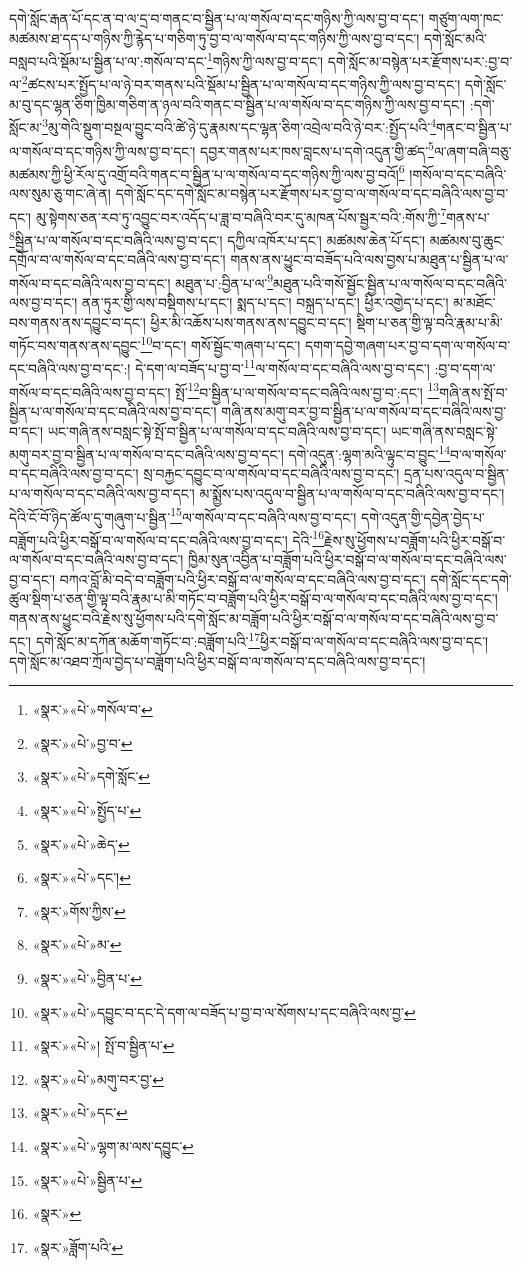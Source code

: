 དགེ་སློང་རྒན་པོ་དང་ན་བ་ལ་དྲ་བ་གནང་བ་སྦྱིན་པ་ལ་གསོལ་བ་དང་གཉིས་ཀྱི་ལས་བྱ་བ་དང་། གཙུག་ལག་ཁང་མཚམས་ཐ་དད་པ་གཉིས་ཀྱི་རྙེད་པ་གཅིག་ཏུ་བྱ་བ་ལ་གསོལ་བ་དང་གཉིས་ཀྱི་ལས་བྱ་བ་དང་། དགེ་སློང་མའི་བསླབ་པའི་སྡོམ་པ་སྦྱིན་པ་ལ་:གསོལ་བ་དང་\footnote{«སྣར་»«པེ་»གསོལ་བ་}གཉིས་ཀྱི་ལས་བྱ་བ་དང་། དགེ་སློང་མ་བསྙེན་པར་རྫོགས་པར་:བྱ་བ་ལ་\footnote{«སྣར་»«པེ་»བྱ་བ་}ཚངས་པར་སྤྱོད་པ་ལ་ཉེ་བར་གནས་པའི་སྡོམ་པ་སྦྱིན་པ་ལ་གསོལ་བ་དང་གཉིས་ཀྱི་ལས་བྱ་བ་དང་། དགེ་སློང་མ་བུ་དང་ལྷན་ཅིག་ཁྱིམ་གཅིག་ན་ཉལ་བའི་གནང་བ་སྦྱིན་པ་ལ་གསོལ་བ་དང་གཉིས་ཀྱི་ལས་བྱ་བ་དང་། :དགེ་སློང་མ་\footnote{«སྣར་»«པེ་»དགེ་སློང་}མུ་གེའི་སྡུག་བསྔལ་བྱུང་བའི་ཚེ་ཉེ་དུ་རྣམས་དང་ལྷན་ཅིག་འབྲེལ་བའི་ཉེ་བར་:སྤྱོད་པའི་\footnote{«སྣར་»«པེ་»སྤྱོད་པ་}གནང་བ་སྦྱིན་པ་ལ་གསོལ་བ་དང་གཉིས་ཀྱི་ལས་བྱ་བ་དང་། དབྱར་གནས་པར་ཁས་བླངས་པ་དགེ་འདུན་གྱི་ཚད་\footnote{«སྣར་»«པེ་»ཆེད་}ལ་ཞག་བཞི་བཅུ་མཚམས་ཀྱི་ཕྱི་རོལ་དུ་འགྲོ་བའི་གནང་བ་སྦྱིན་པ་ལ་གསོལ་བ་དང་གཉིས་ཀྱི་ལས་བྱ་བའོ།\footnote{«སྣར་»«པེ་»དང་།} །གསོལ་བ་དང་བཞིའི་ལས་སུམ་ཅུ་གང་ཞེ་ན། དགེ་སློང་དང་དགེ་སློང་མ་བསྙེན་པར་རྫོགས་པར་བྱ་བ་ལ་གསོལ་བ་དང་བཞིའི་ལས་བྱ་བ་དང་། མུ་སྟེགས་ཅན་རབ་ཏུ་འབྱུང་བར་འདོད་པ་ཟླ་བ་བཞིའི་བར་དུ་མཁན་པོས་སྦྱར་བའི་:གོས་ཀྱི་\footnote{«སྣར་»གོས་ཀྱིས་}གནས་པ་\footnote{«སྣར་»«པེ་»མ་}སྦྱིན་པ་ལ་གསོལ་བ་དང་བཞིའི་ལས་བྱ་བ་དང་། དཀྱིལ་འཁོར་པ་དང་། མཚམས་ཆེན་པོ་དང་། མཚམས་བུ་ཆུང་དགྲོལ་བ་ལ་གསོལ་བ་དང་བཞིའི་ལས་བྱ་བ་དང་། གནས་ནས་ཕྱུང་བ་བཟོད་པའི་ལས་བྱས་པ་མཐུན་པ་སྦྱིན་པ་ལ་གསོལ་བ་དང་བཞིའི་ལས་བྱ་བ་དང་། མཐུན་པ་:བྱིན་པ་ལ་\footnote{«སྣར་»«པེ་»བྱིན་པ་}མཐུན་པའི་གསོ་སྦྱོང་སྦྱིན་པ་ལ་གསོལ་བ་དང་བཞིའི་ལས་བྱ་བ་དང་། ནན་ཏུར་གྱི་ལས་བསྡིགས་པ་དང་། སྨད་པ་དང་། བསྐྲད་པ་དང་། ཕྱིར་འགྱེད་པ་དང་། མ་མཐོང་བས་གནས་ནས་དབྱུང་བ་དང་། ཕྱིར་མི་འཆོས་པས་གནས་ནས་དབྱུང་བ་དང་། སྡིག་པ་ཅན་གྱི་ལྟ་བའི་རྣམ་པ་མི་གཏོང་བས་གནས་ནས་དབྱུང་\footnote{«སྣར་»«པེ་»དབྱུང་བ་དང་དེ་དག་ལ་བཟོད་པ་བྱ་བ་ལ་སོགས་པ་དང་བཞིའི་ལས་བྱ་}བ་དང་། གསོ་སྦྱོང་གཞག་པ་དང་། དགག་དབྱེ་གཞག་པར་བྱ་བ་དག་ལ་གསོལ་བ་དང་བཞིའི་ལས་བྱ་བ་དང་:། དེ་དག་ལ་བཟོད་པ་བྱ་བ་\footnote{«སྣར་»«པེ་»།  སྤོ་བ་སྦྱིན་པ་}ལ་གསོལ་བ་དང་བཞིའི་ལས་བྱ་བ་དང་། :བྱ་བ་དག་ལ་གསོལ་བ་དང་བཞིའི་ལས་བྱ་བ་དང་། སྤོ་\footnote{«སྣར་»«པེ་»མགུ་བར་བྱ་}བ་སྦྱིན་པ་ལ་གསོལ་བ་དང་བཞིའི་ལས་བྱ་བ་:དང་། \footnote{«སྣར་»«པེ་»དང་}གཞི་ནས་སྤོ་བ་སྦྱིན་པ་ལ་གསོལ་བ་དང་བཞིའི་ལས་བྱ་བ་དང་། གཞི་ནས་མགུ་བར་བྱ་བ་སྦྱིན་པ་ལ་གསོལ་བ་དང་བཞིའི་ལས་བྱ་བ་དང་། ཡང་གཞི་ནས་བསླང་སྟེ་སྤོ་བ་སྦྱིན་པ་ལ་གསོལ་བ་དང་བཞིའི་ལས་བྱ་བ་དང་། ཡང་གཞི་ནས་བསླང་སྟེ་མགུ་བར་བྱ་བ་སྦྱིན་པ་ལ་གསོལ་བ་དང་བཞིའི་ལས་བྱ་བ་དང་། དགེ་འདུན་:ལྷག་མའི་ལྟུང་བ་བྱུང་\footnote{«སྣར་»«པེ་»ལྷག་མ་ལས་དབྱུང་}བ་ལ་གསོལ་བ་དང་བཞིའི་ལས་བྱ་བ་དང་། སྲ་བརྐྱང་དབྱུང་བ་ལ་གསོལ་བ་དང་བཞིའི་ལས་བྱ་བ་དང་། དྲན་པས་འདུལ་བ་སྦྱིན་པ་ལ་གསོལ་བ་དང་བཞིའི་ལས་བྱ་བ་དང་། མ་སྨྱོས་པས་འདུལ་བ་སྦྱིན་པ་ལ་གསོལ་བ་དང་བཞིའི་ལས་བྱ་བ་དང་། དེའི་ངོ་བོ་ཉིད་ཚོལ་དུ་གཞུག་པ་སྦྱིན་\footnote{«སྣར་»«པེ་»སྦྱིན་པ་}ལ་གསོལ་བ་དང་བཞིའི་ལས་བྱ་བ་དང་། དགེ་འདུན་གྱི་དབྱེན་བྱེད་པ་བཟློག་པའི་ཕྱིར་བསྒོ་བ་ལ་གསོལ་བ་དང་བཞིའི་ལས་བྱ་བ་དང་། དེའི་\footnote{«སྣར་»}རྗེས་སུ་ཕྱོགས་པ་བཟློག་པའི་ཕྱིར་བསྒོ་བ་ལ་གསོལ་བ་དང་བཞིའི་ལས་བྱ་བ་དང་། ཁྱིམ་སུན་འབྱིན་པ་བཟློག་པའི་ཕྱིར་བསྒོ་བ་ལ་གསོལ་བ་དང་བཞིའི་ལས་བྱ་བ་དང་། བཀའ་བློ་མི་བདེ་བ་བཟློག་པའི་ཕྱིར་བསྒོ་བ་ལ་གསོལ་བ་དང་བཞིའི་ལས་བྱ་བ་དང་། དགེ་སློང་དང་དགེ་ཚུལ་སྡིག་པ་ཅན་གྱི་ལྟ་བའི་རྣམ་པ་མི་གཏོང་བ་བཟློག་པའི་ཕྱིར་བསྒོ་བ་ལ་གསོལ་བ་དང་བཞིའི་ལས་བྱ་བ་དང་། གནས་ནས་ཕྱུང་བའི་རྗེས་སུ་ཕྱོགས་པའི་དགེ་སློང་མ་བཟློག་པའི་ཕྱིར་བསྒོ་བ་ལ་གསོལ་བ་དང་བཞིའི་ལས་བྱ་བ་དང་། དགེ་སློང་མ་དཀོན་མཆོག་གཏོང་བ་:བཟློག་པའི་\footnote{«སྣར་»ཟློག་པའི་}ཕྱིར་བསྒོ་བ་ལ་གསོལ་བ་དང་བཞིའི་ལས་བྱ་བ་དང་། དགེ་སློང་མ་འཐབ་ཀྲོལ་བྱེད་པ་བཟློག་པའི་ཕྱིར་བསྒོ་བ་ལ་གསོལ་བ་དང་བཞིའི་ལས་བྱ་བ་དང་། 